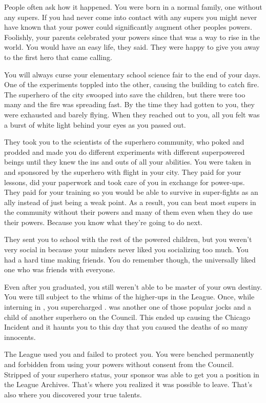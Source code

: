 \documentclass[char]{LRSguildcamp1}
\begin{document}
\name{\cYS{}}

People often ask how it happened. You were born in a normal family, one without any supers. If you had never come into contact with any supers you might never have known that your power could significantly augment other peoples powers. Foolishly, your parents celebrated your powers since that was a way to rise in the world. You would have an easy life, they said. They were happy to give you away to the first hero that came calling. 

You will always curse your elementary school science fair to the end of your days. One of the experiments toppled into the other, causing the building to catch fire. The superhero of the city swooped into save the children, but there were too many and the fire was spreading fast. By the time they had gotten to you, they were exhausted and barely flying. When they reached out to you, all you felt was a burst of white light behind your eyes as you passed out. 

They took you to the scientists of the superhero community, who poked and prodded and made you do different experiments with different superpowered beings until they knew the ins and outs of all your abilities. You were taken in and sponsored by the superhero with flight in your city. They paid for your lessons, did your paperwork and took care of you in exchange for power-ups. They paid for your training so you would be able to survive in super-fights as an ally instead of just being a weak point. As a result, you can beat most supers in the community without their powers and many of them even when they do use their powers. Because you know what they're going to do next.  

They sent you to school with the rest of the powered children, but you weren't very social in \pSuperSchool{} because your minders never liked you socializing too much. You had a hard time making friends. You do remember \cYoungest{} though, the universally liked one who was friends with everyone. 

Even after you graduated, you still weren't able to be master of your own destiny. You were till subject to the whims of the higher-ups in the League. Once, while interning in \pCityO{} , you supercharged \cJuggernaut{}.  \cJuggernaut{} was another one of those popular jocks and a child of another superhero on the Council. This ended up causing the Chicago Incident and it haunts you to this day that you caused the deaths of so many innocents. 

The League used you and failed to protect you. You were benched permanently and forbidden from using your powers without consent from the Council. Stripped of your superhero status, your sponsor was able to get you a position in the League Archives. That's where you realized it was possible to leave. That's also where you discovered your true talents. 
\end{document}
